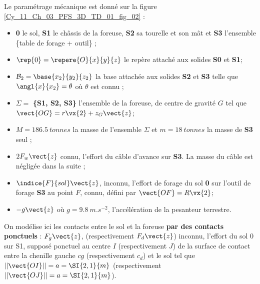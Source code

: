 Le paramétrage mécanique est donné sur la figure \ref{Cy_11_Ch_03_PFS_3D_TD_01_fig_02} : 
\begin{itemize}
\item \textbf{0} le sol, \textbf{S1} le châssis de la foreuse, \textbf{S2} sa tourelle et son mât et \textbf{S3} l’ensemble \{table de forage + outil\} ; 
\item $\rep{0} = \repere{O}{x}{y}{z}$ le repère attaché aux solides \textbf{S0} et \textbf{S1}; 
\item $\mathcal{B}_2=\base{x_2}{y_2}{z_2}$ la base attachée aux solides \textbf{S2} et \textbf{S3} telle que $\angl{x}{x_2}=\theta$ où $\theta$ est connu ;
\item $\Sigma = $ \textbf{\{S1, S2, S3\}} l’ensemble de la foreuse, de centre de gravité $G$ tel que $\vect{OG} = r \vx{2} +  z_G \vect{z}$;
\item $M = \SI{186,5}{tonnes}$ la masse de l’ensemble $\Sigma$ et $m =\SI{18}{tonnes}$ la masse de \textbf{S3} seul ; 
\item $2F_w \vect{z}$ connu, l’effort du câble d’avance sur \textbf{S3}. La masse du câble est négligée dans la suite ; 
\item $\indice{F}{sol}\vect{z}$, inconnu, l’effort de forage du sol \textbf{0} sur l’outil de forage \textbf{S3} au point $F$, connu, défini par $\vect{OF}=R\vx{2}$;
\item $-g\vect{z}$  où $g = \SI{9,8}{m.s^{-2}}$, l’accélération de la pesanteur terrestre.
\end{itemize}

On modélise ici les contacts entre le sol et la foreuse \textbf{par des contacts ponctuels}  :
$F_g \vect{z}$, (respectivement  $F_d \vect{z}$) inconnu, l’effort du sol 0 sur S1, supposé ponctuel au centre $I$ (respectivement  $J$) de la surface de contact entre la chenille gauche $cg$ (respectivement  $c_d$) et le sol tel que $||\vect{OI}|| = a=\SI{2,1}{m}$ (respectivement  $||\vect{OJ}|| = a=\SI{2,1}{m}$).
\fi


